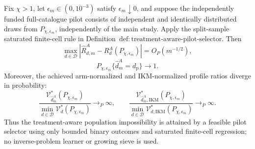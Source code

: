 Fix \(\chi>1\), let \(\epsilon_m\in(0,10^{-3})\) satisfy \(\epsilon_m\downarrow0\), and suppose the independently funded full-catalogue pilot consists of independent and identically distributed draws from \(P_{\chi,\epsilon_m}\), independently of the main study. Apply the split-sample saturated finite-cell rule in Definition~\(\mathrm{def{:}treatment\text{-}aware\text{-}pilot\text{-}selector}\). Then
\[
 \max_{d\in\mathcal D}
 |\widehat R_{d,m}^A-R_d^A(P_{\chi,\epsilon_m})|=O_P(m^{-1/2}), \tag{1}
\]
\[
 P_{\chi,\epsilon_m}\{\widehat d_m^A=d_{\mathrm p}\}\longrightarrow1. \tag{2}
\]
Moreover, the achieved arm-normalized and IKM-normalized profile ratios diverge in probability:
\[
 \frac{\mathcal V_{\widehat d_m^A}^*(P_{\chi,\epsilon_m})}
 {\min_{d\in\mathcal D}\mathcal V_d^*(P_{\chi,\epsilon_m})}
 \longrightarrow_P\infty,
 \qquad
 \frac{\mathcal V_{\widehat d_m^A,\mathrm{IKM}}^*(P_{\chi,\epsilon_m})}
 {\min_{d\in\mathcal D}\mathcal V_{d,\mathrm{IKM}}^*(P_{\chi,\epsilon_m})}
 \longrightarrow_P\infty. \tag{3}
\]
Thus the treatment-aware population impossibility is attained by a feasible pilot selector using only bounded binary outcomes and saturated finite-cell regression; no inverse-problem learner or growing sieve is used.
